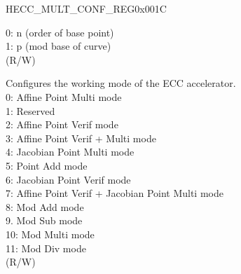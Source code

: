 \begin{register}{H}{ECC\_MULT\_CONF\_REG}{0x001C}
\begin{regdesc}
\begin{reglist}
0: n (order of base point)\\
1: p (mod base of curve)\\
(R/W)
\label{fielddesc:ECCMULTWORKMODE}\item [ECC\_MULT\_WORK\_MODE] Configures the working mode of the ECC accelerator.\\
0: Affine Point Multi mode\\
1: Reserved\\
2: Affine Point Verif mode\\
3: Affine Point Verif + Multi mode\\
4: Jacobian Point Multi mode\\
5: Point Add mode\\
6: Jacobian Point Verif mode\\
7: Affine Point Verif + Jacobian Point Multi mode\\
8: Mod Add mode\\
9. Mod Sub mode\\
10: Mod Multi mode\\
11: Mod Div mode\\
(R/W)

\item [Continued on the next page...]
\end{reglist}\end{regdesc}
\end{register}
\addtocounter{Regfloat}{-1}
